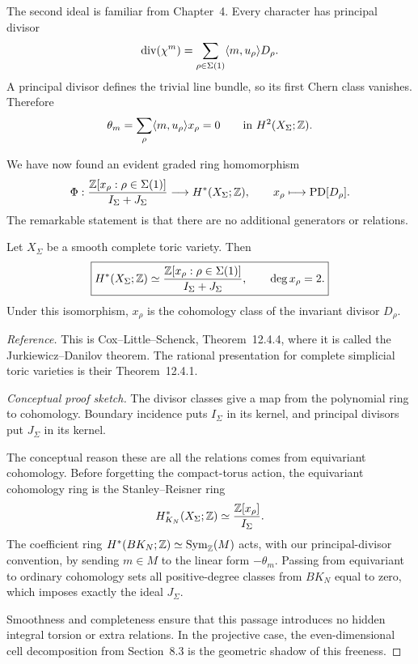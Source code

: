 The second ideal is familiar from Chapter~4. Every character has
principal divisor
\[
\operatorname{div}(\chi^{m})
=
\sum_{\rho\in\Sigma(1)}
\langle m,u_\rho\rangle D_\rho.
\]
A principal divisor defines the trivial line bundle, so its first Chern
class vanishes. Therefore
\[
\theta_m
=
\sum_\rho\langle m,u_\rho\rangle x_\rho
=0
\qquad\text{in }H^2(X_\Sigma;\mathbb{Z}).
\]

We have now found an evident graded ring homomorphism
\[
\Phi:
\frac{\mathbb{Z}[x_\rho:\rho\in\Sigma(1)]}
     {I_\Sigma+J_\Sigma}
\longrightarrow
H^*(X_\Sigma;\mathbb{Z}),
\qquad
x_\rho\longmapsto\operatorname{PD}[D_\rho].
\]
The remarkable statement is that there are no additional generators
or relations.

\begin{theorem}
\label{thm:jurkiewicz-danilov-presentation}
Let \(X_\Sigma\) be a smooth complete toric variety. Then
\[
\boxed{
H^*(X_\Sigma;\mathbb{Z})
\simeq
\frac{\mathbb{Z}[x_\rho:\rho\in\Sigma(1)]}
     {I_\Sigma+J_\Sigma},
\qquad
\deg x_\rho=2.
}
\]
Under this isomorphism, \(x_\rho\) is the cohomology class of the
invariant divisor \(D_\rho\).
\end{theorem}

\noindent
\textit{Reference.}
This is Cox--Little--Schenck, Theorem~12.4.4, where it is called the
Jurkiewicz--Danilov theorem. The rational presentation for complete
simplicial toric varieties is their Theorem~12.4.1.

\begin{proof}[Conceptual proof sketch]
The divisor classes give a map from the polynomial ring to cohomology.
Boundary incidence puts \(I_\Sigma\) in its kernel, and principal
divisors put \(J_\Sigma\) in its kernel.

The conceptual reason these are all the relations comes from
equivariant cohomology. Before forgetting the compact-torus action, the
equivariant cohomology ring is the Stanley--Reisner ring
\[
H^*_{K_N}(X_\Sigma;\mathbb{Z})
\simeq
\frac{\mathbb{Z}[x_\rho]}{I_\Sigma}.
\]
The coefficient ring \(H^*(BK_N;\mathbb{Z})\simeq\operatorname{Sym}_{\mathbb{Z}}(M)\)
acts, with our principal-divisor convention, by sending
\(m\in M\) to the linear form \(-\theta_m\). Passing
from equivariant to ordinary cohomology sets all positive-degree
classes from \(BK_N\) equal to zero, which imposes exactly the ideal
\(J_\Sigma\).

Smoothness and completeness ensure that this passage introduces no
hidden integral torsion or extra relations. In the projective case,
the even-dimensional cell decomposition from Section~8.3 is the
geometric shadow of this freeness.
\end{proof}

